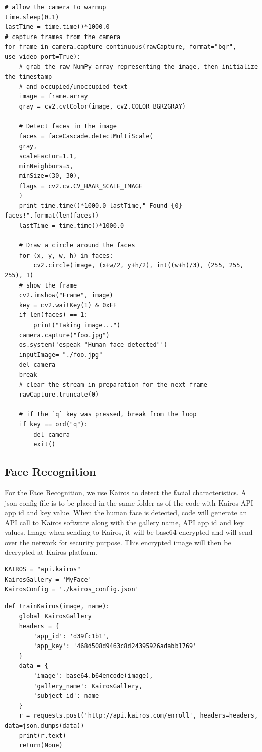 \documentclass[sigconf]{acmart}
\begin{document}
\begin{lstlisting}
# allow the camera to warmup
time.sleep(0.1)
lastTime = time.time()*1000.0
# capture frames from the camera
for frame in camera.capture_continuous(rawCapture, format="bgr", use_video_port=True):
	# grab the raw NumPy array representing the image, then initialize the timestamp
	# and occupied/unoccupied text
    image = frame.array
    gray = cv2.cvtColor(image, cv2.COLOR_BGR2GRAY)
    
    # Detect faces in the image
    faces = faceCascade.detectMultiScale(
    gray,
    scaleFactor=1.1,
    minNeighbors=5,
    minSize=(30, 30),
    flags = cv2.cv.CV_HAAR_SCALE_IMAGE
    )
    print time.time()*1000.0-lastTime," Found {0} faces!".format(len(faces))
    lastTime = time.time()*1000.0

    # Draw a circle around the faces
    for (x, y, w, h) in faces:
        cv2.circle(image, (x+w/2, y+h/2), int((w+h)/3), (255, 255, 255), 1)
    # show the frame
    cv2.imshow("Frame", image)
    key = cv2.waitKey(1) & 0xFF
    if len(faces) == 1:
        print("Taking image...")
	camera.capture("foo.jpg")
	os.system('espeak "Human face detected"')
	inputImage= "./foo.jpg"
	del camera
	break 
	# clear the stream in preparation for the next frame
    rawCapture.truncate(0)
    
	# if the `q` key was pressed, break from the loop
    if key == ord("q"):
        del camera
        exit()
\end{lstlisting}


\subsection{Face Recognition}
For the Face Recognition, we use Kairos to detect the facial characteristics. A json config file is to be placed in the same folder as of the code with Kairos API app id and key value. When the human face is detected, code will generate an API call to Kairos software along with the gallery name, API app id and key values. Image when sending to Kairos, it will be base64 encrypted and will send over the network for security purpose. This encrypted image will then be decrypted at Kairos platform.


\begin{lstlisting}
KAIROS = "api.kairos"
KairosGallery = 'MyFace'
KairosConfig = './kairos_config.json'
\end{lstlisting}

\begin{lstlisting}
def trainKairos(image, name):
    global KairosGallery
    headers = {
        'app_id': 'd39fc1b1',
        'app_key': '468d508d9463c8d24395926adabb1769'
    }
    data = {
        'image': base64.b64encode(image),
        'gallery_name': KairosGallery,
        'subject_id': name
    }
    r = requests.post('http://api.kairos.com/enroll', headers=headers, data=json.dumps(data))
    print(r.text)
    return(None)
\end{lstlisting}
\end{document}
